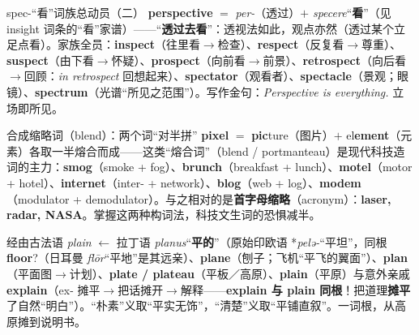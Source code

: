 \documentclass[../main.tex]{subfiles}
\begin{document}

\begin{gram}{spec-“看”词族总动员（二）}
\textbf{perspective} $=$ \textit{per-}（透过）$+$ \textit{specere}“\textbf{看}”（见 insight 词条的“看”家谱）——“\textbf{透过去看}”：透视法如此，观点亦然（透过某个立足点看）。家族全员：\textbf{inspect}（往里看$\to$检查）、\textbf{respect}（反复看$\to$尊重）、\textbf{suspect}（由下看$\to$怀疑）、\textbf{prospect}（向前看$\to$前景）、\textbf{retrospect}（向后看$\to$回顾：\textit{in retrospect} 回想起来）、\textbf{spectator}（观看者）、\textbf{spectacle}（景观；眼镜）、\textbf{spectrum}（光谱“所见之范围”）。写作金句：\textit{Perspective is everything.} 立场即所见。
\end{gram}



\begin{gram}{合成缩略词（blend）：两个词“对半拼”}
\textbf{pixel} $=$ \textbf{pic}ture（图片）$+$ el\textbf{ement}（元素）各取一半熔合而成——这类“熔合词”（blend / portmanteau）是现代科技造词的主力：\textbf{smog}（smoke + fog）、\textbf{brunch}（breakfast + lunch）、\textbf{motel}（motor + hotel）、\textbf{internet}（inter- + network）、\textbf{blog}（web + log）、\textbf{modem}（modulator + demodulator）。与之相对的是\textbf{首字母缩略}（acronym）：\textbf{laser, radar, NASA}。掌握这两种构词法，科技文生词的恐惧减半。
\end{gram}




\begin{origin}
经由古法语 \textit{plain} $\leftarrow$ 拉丁语 \textit{planus}“\textbf{平的}”（原始印欧语 *\textit{pelə-}“平坦”，同根 \textbf{floor}?（日耳曼 \textit{flōr}“平地”是其远亲）、\textbf{plane}（刨子；飞机“平飞的翼面”）、\textbf{plan}（平面图$\to$计划）、\textbf{plate / plateau}（平板／高原）、\textbf{plain}（平原）与意外亲戚 \textbf{explain}（ex- 摊平$\to$把话摊开$\to$解释——\textbf{explain 与 plain 同根}！把道理\textbf{摊平}了自然“明白”）。“朴素”义取“平实无饰”，“清楚”义取“平铺直叙”。一词根，从高原摊到说明书。
\end{origin}
\end{document}
